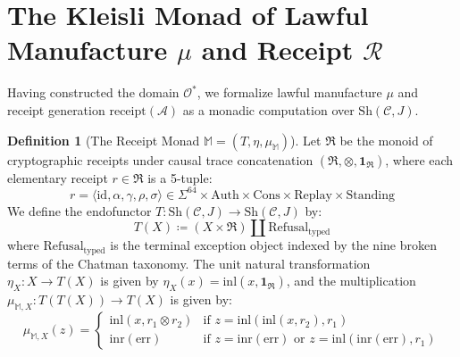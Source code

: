 \documentclass[10pt,twoside,openany]{book}
\theoremstyle{plain}
\theoremstyle{definition}
\newtheorem{definition}[theorem]{Definition}
\theoremstyle{remark}
\newcommand{\Oadm}{\mathcal{O}^*}
\newcommand{\Act}{\mathcal{A}}
\newcommand{\Rec}{\mathcal{R}}
\begin{document}
\section{The Kleisli Monad of Lawful Manufacture $\mu$ and Receipt $\Rec$}
Having constructed the domain $\Oadm$, we formalize lawful manufacture $\mu$ and receipt generation $\mathrm{receipt}(\Act)$ as a monadic computation over $\mathrm{Sh}(\mathcal{C}, J)$.

\begin{definition}[The Receipt Monad $\mathbb{M} = (T, \eta, \mu_{\mathbb{M}})$]
Let $\mathfrak{R}$ be the monoid of cryptographic receipts under causal trace concatenation $(\mathfrak{R}, \otimes, \mathbf{1}_{\mathfrak{R}})$, where each elementary receipt $r \in \mathfrak{R}$ is a 5-tuple:
\begin{equation}
r = \langle \mathrm{id}, \alpha, \gamma, \rho, \sigma \rangle \in \Sigma^{64} \times \mathrm{Auth} \times \mathrm{Cons} \times \mathrm{Replay} \times \mathrm{Standing}
\end{equation}
We define the endofunctor $T: \mathrm{Sh}(\mathcal{C}, J) \to \mathrm{Sh}(\mathcal{C}, J)$ by:
\begin{equation}
T(X) \coloneqq (X \times \mathfrak{R}) \amalg \mathrm{Refusal}_{\mathrm{typed}}
\end{equation}
where $\mathrm{Refusal}_{\mathrm{typed}}$ is the terminal exception object indexed by the nine broken terms of the Chatman taxonomy. The unit natural transformation $\eta_X: X \to T(X)$ is given by $\eta_X(x) = \mathrm{inl}(x, \mathbf{1}_{\mathfrak{R}})$, and the multiplication $\mu_{\mathbb{M}, X}: T(T(X)) \to T(X)$ is given by:
\begin{equation}
\mu_{\mathbb{M}, X}(z) = \begin{cases}
\mathrm{inl}(x, r_1 \otimes r_2) & \text{if } z = \mathrm{inl}(\mathrm{inl}(x, r_2), r_1) \\
\mathrm{inr}(\mathrm{err}) & \text{if } z = \mathrm{inr}(\mathrm{err}) \text{ or } z = \mathrm{inl}(\mathrm{inr}(\mathrm{err}), r_1)
\end{cases}
\end{equation}
\end{definition}
\end{document}
